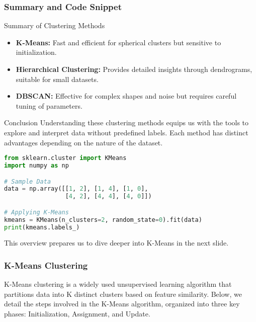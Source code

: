 \documentclass[aspectratio=169]{beamer}
\begin{document}
\begin{frame}[fragile]
  \frametitle{Summary and Code Snippet}
  \begin{block}{Summary of Clustering Methods}
    \begin{itemize}
      \item \textbf{K-Means:} Fast and efficient for spherical clusters but sensitive to initialization.
      \item \textbf{Hierarchical Clustering:} Provides detailed insights through dendrograms, suitable for small datasets.
      \item \textbf{DBSCAN:} Effective for complex shapes and noise but requires careful tuning of parameters.
    \end{itemize}
  \end{block}
  
  \begin{block}{Conclusion}
    Understanding these clustering methods equips us with the tools to explore and interpret data without predefined labels. Each method has distinct advantages depending on the nature of the dataset.
  \end{block}
  
  \begin{lstlisting}[language=Python]
from sklearn.cluster import KMeans
import numpy as np

# Sample Data
data = np.array([[1, 2], [1, 4], [1, 0],
                 [4, 2], [4, 4], [4, 0]])

# Applying K-Means
kmeans = KMeans(n_clusters=2, random_state=0).fit(data)
print(kmeans.labels_)
  \end{lstlisting}
  
  This overview prepares us to dive deeper into K-Means in the next slide.
\end{frame}

\begin{frame}[fragile]
    \frametitle{K-Means Clustering}
    K-Means clustering is a widely used unsupervised learning algorithm that partitions data into K distinct clusters based on feature similarity. 
    Below, we detail the steps involved in the K-Means algorithm, organized into three key phases: 
    Initialization, Assignment, and Update.
\end{frame}
\end{document}
